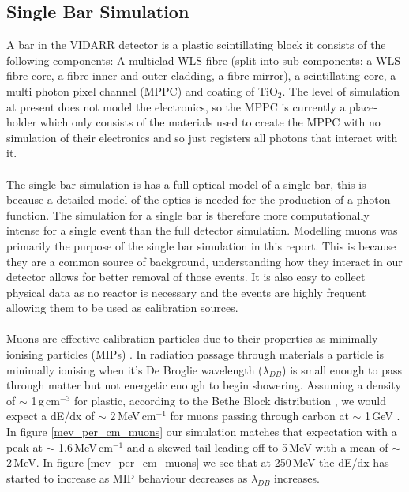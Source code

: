 \documentclass[12pt,a4paper]{article}
\begin{document}
\subsection{Single Bar Simulation}
A bar in the VIDARR detector is a plastic scintillating block it consists of the following components: A multiclad WLS fibre (split into sub components: a WLS fibre core, a fibre inner and outer cladding, a fibre mirror), a scintillating core, a multi photon pixel channel (MPPC) and coating of TiO$_2$. The level of simulation at present does not model the electronics, so the MPPC is currently a place-holder which only consists of the materials used to create the MPPC with no simulation of their electronics and so just registers all photons that interact with it.  
\\\\The single bar simulation is has a full optical model of a single bar, this is because a detailed model of the optics is needed for the production of a photon function. The simulation for a single bar is therefore more computationally intense for a single event than the full detector simulation. Modelling muons was primarily the purpose of the single bar simulation in this report. This is because they are a common source of background, understanding how they interact in our detector allows for better removal of those events. It is also easy to collect physical data as no reactor is necessary and the events are highly frequent allowing them to be used as calibration sources.\\\\
Muons are effective calibration particles due to their properties as minimally ionising particles (MIPs) \cite{pdg_passage}. In radiation passage through materials a particle is minimally ionising when it's De Broglie wavelength ($\lambda_{DB}$) is small enough to pass through matter but not energetic enough to begin showering. Assuming a density of $\sim$ 1\,g\,cm$^{-3}$ for plastic, according to the Bethe Block distribution \cite{pdg_passage}, we would expect a dE/dx of $\sim$ 2\,MeV\,cm$^{-1}$ for muons passing through carbon at $\sim$ 1\,GeV \protect\cite{pdg_passage}. In figure {\ref{mev_per_cm_muons}} our simulation matches that expectation with a peak at $\sim$ 1.6\,MeV\,cm$^{-1}$ and a skewed tail leading off to 5\,MeV with a mean of $\sim$ 2\,MeV. In figure {\ref{mev_per_cm_muons}} we see that at 250\,MeV the dE/dx has started to increase as MIP behaviour decreases as $\lambda_{DB}$ increases.
\end{document}
